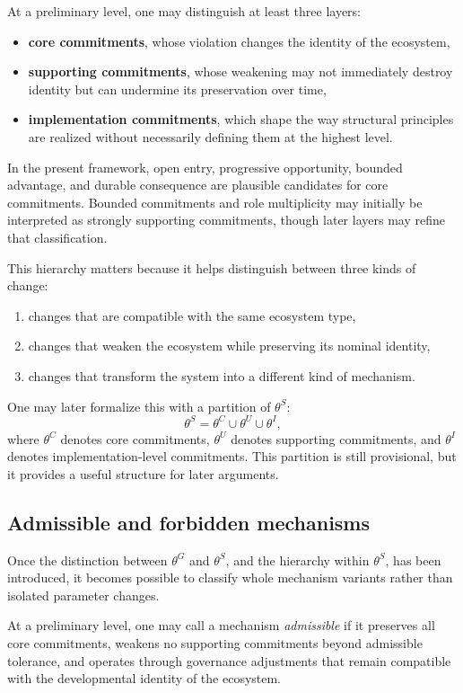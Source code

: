 \documentclass[11pt]{article}
\begin{document}
At a preliminary level, one may distinguish at least three layers:
\begin{itemize}
  \item \textbf{core commitments}, whose violation changes the identity of the ecosystem,
  \item \textbf{supporting commitments}, whose weakening may not immediately destroy identity but can undermine its preservation over time,
  \item \textbf{implementation commitments}, which shape the way structural principles are realized without necessarily defining them at the highest level.
\end{itemize}

In the present framework, open entry, progressive opportunity, bounded advantage, and durable consequence are plausible candidates for core commitments. Bounded commitments and role multiplicity may initially be interpreted as strongly supporting commitments, though later layers may refine that classification.

This hierarchy matters because it helps distinguish between three kinds of change:
\begin{enumerate}
  \item changes that are compatible with the same ecosystem type,
  \item changes that weaken the ecosystem while preserving its nominal identity,
  \item changes that transform the system into a different kind of mechanism.
\end{enumerate}

One may later formalize this with a partition of \(\theta^{S}\):
\[
\theta^{S} = \theta^{C} \cup \theta^{U} \cup \theta^{I},
\]
where \(\theta^{C}\) denotes core commitments, \(\theta^{U}\) denotes supporting commitments, and \(\theta^{I}\) denotes implementation-level commitments. This partition is still provisional, but it provides a useful structure for later arguments.

\subsection{Admissible and forbidden mechanisms}

Once the distinction between \(\theta^{G}\) and \(\theta^{S}\), and the hierarchy within \(\theta^{S}\), has been introduced, it becomes possible to classify whole mechanism variants rather than isolated parameter changes.

At a preliminary level, one may call a mechanism \emph{admissible} if it preserves all core commitments, weakens no supporting commitments beyond admissible tolerance, and operates through governance adjustments that remain compatible with the developmental identity of the ecosystem.
\end{document}
